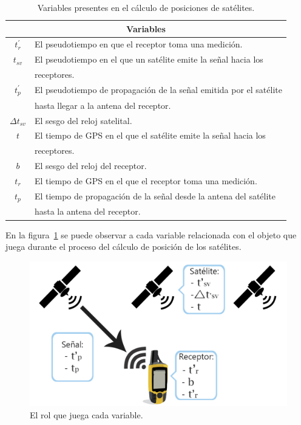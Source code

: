 \begin{table}[!htb]
\begin{center}
\caption{Variables presentes en el cálculo de posiciones de satélites.}
\label{Tab:TablaVariables}
\begin{tabular}{|c|l|}
	\hline
	\multicolumn{2}{|c|}{\textbf{Variables}}\\
	\hline
	$t^{'}_r$ & El pseudotiempo en que el receptor toma una medición.\\
	\hline
	$t_{sv}$ & El pseudotiempo en el que un satélite emite la señal hacia los \\ & receptores.\\
	\hline
	$t^{'}_p$ & El pseudotiempo de propagación de la señal emitida por el satélite\\ & hasta llegar a la antena del receptor.\\
	\hline
	$\Delta t_{sv}$ & El sesgo del reloj satelital.\\
	\hline
	$t$ & El tiempo de GPS en el que el satélite emite la señal hacia los\\ & receptores.\\
	\hline 
	$b$ & El sesgo del reloj del receptor.\\
	\hline
	$t_r$ & El tiempo de GPS en el que el receptor toma una medición.\\
	\hline
	$t_p$ & El tiempo de propagación de la señal desde la antena del satélite\\ & hasta la antena del receptor.\\
	\hline
\end{tabular}
\end{center}
\end{table}

En la figura~\ref{fig:DiagMat} se puede observar a cada variable relacionada con el objeto que juega durante el proceso del cálculo de posición de los satélites. 

\begin{figure}[H]
\centering
\includegraphics[scale=0.41]{Figures/DiagramaMat}
\caption[El rol que juega cada variable.]{El rol que juega cada variable.}
\label{fig:DiagMat}
\end{figure}

